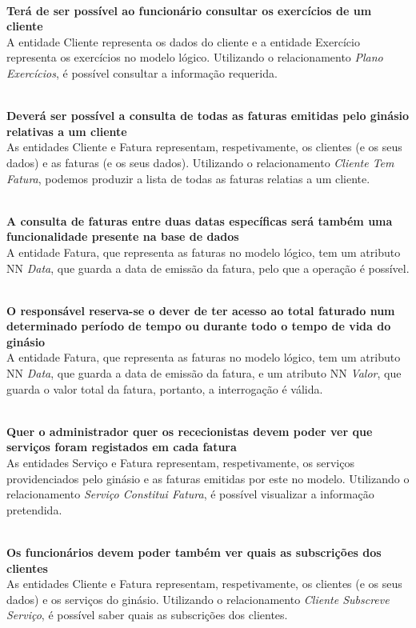 \noindent
\\\textbf{Terá de ser possível ao funcionário consultar os exercícios de um cliente}
\\ A entidade Cliente representa os dados do cliente e a entidade Exercício representa os exercícios no modelo lógico. Utilizando o relacionamento \emph{Plano Exercícios}, é possível consultar a informação requerida.

\noindent
\\\textbf{Deverá ser possível a consulta de todas as faturas emitidas pelo ginásio relativas a um cliente}
\\ As entidades Cliente e Fatura representam, respetivamente, os clientes (e os seus dados) e as faturas (e os seus dados). Utilizando o relacionamento \emph{Cliente Tem Fatura}, podemos produzir a lista de todas as faturas relatias a um cliente.

\noindent
\\\textbf{A consulta de faturas entre duas datas específicas será também uma funcionalidade presente na base de dados}
\\ A entidade Fatura, que representa as faturas no modelo lógico, tem um atributo NN \emph{Data}, que guarda a data de emissão da fatura, pelo que a operação é possível.

\noindent
\\\textbf{O responsável reserva-se o dever de ter acesso ao total faturado num determinado período de tempo ou durante todo o tempo de vida do ginásio}
\\ A entidade Fatura, que representa as faturas no modelo lógico, tem um atributo NN \emph{Data}, que guarda a data de emissão da fatura, e um atributo NN \emph{Valor}, que guarda o valor total da fatura, portanto, a interrogação é válida.

\noindent
\\\textbf{Quer o administrador quer os rececionistas devem poder ver que serviços foram registados em cada fatura}
\\ As entidades Serviço e Fatura representam, respetivamente, os serviços providenciados pelo ginásio e as faturas emitidas por este no modelo. Utilizando o relacionamento \emph{Serviço Constitui Fatura}, é possível visualizar a informação pretendida.

\noindent
\\\textbf{Os funcionários devem poder também ver quais as subscrições dos clientes}
\\  As entidades Cliente e Fatura representam, respetivamente, os clientes (e os seus dados) e os serviços do ginásio. Utilizando o relacionamento \emph{Cliente Subscreve Serviço}, é possível saber quais as subscrições dos clientes.
